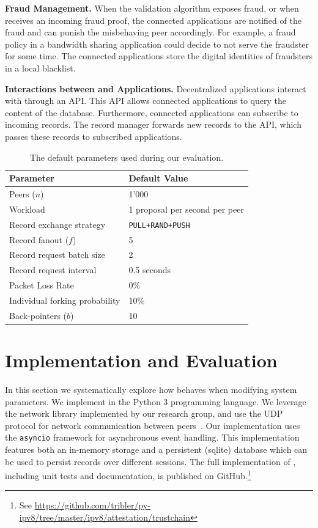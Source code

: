 \textbf{Fraud Management.}
When the validation algorithm exposes fraud, or when \TrustChain{} receives an incoming fraud proof, the connected applications are notified of the fraud and can punish the misbehaving peer accordingly.
For example, a fraud policy in a bandwidth sharing application could decide to not serve the fraudster for some time.
The connected applications store the digital identities of fraudsters in a local blacklist.

\textbf{Interactions between \TrustChain{} and Applications.}
Decentralized applications interact with \TrustChain{} through an API.
This API allows connected applications to query the content of the database.
Furthermore, connected applications can subscribe to incoming records.
The record manager forwards new records to the API, which passes these records to subscribed applications.

\begin{table}[]
	\begin{center}
		\begin{tabular}{l l}
			\hline
			\textbf{Parameter} & \textbf{Default Value}  \\ \hline
			Peers ($ n $) & 1'000 \\
			Workload & 1 proposal per second per peer \\
			Record exchange strategy & \texttt{PULL+RAND+PUSH} \\
			Record fanout ($ f $) & 5 \\
			Record request batch size & 2 \\
			Record request interval & 0.5 seconds \\
			Packet Loss Rate & 0\% \\
			Individual forking probability & 10\% \\
			Back-pointers ($ b $) & 10 \\ \hline
		\end{tabular}
		\caption{The default parameters used during our evaluation.}
		\label{tab:experiment_parameters}
	\end{center}
\end{table}


\section{Implementation and Evaluation}
\label{sec:implementation_evaluation}
In this section we systematically explore how \TrustChain{} behaves when modifying system parameters.
We implement \TrustChain{} in the Python 3 programming language.
We leverage the network library implemented by our research group, and use the UDP protocol for network communication between peers~\cite{ipv8}.
Our implementation uses the \texttt{asyncio} framework for asynchronous event handling.
This implementation features both an in-memory storage and a persistent (sqlite) database which can be used to persist records over different sessions.
The full implementation of \TrustChain{}, including unit tests and documentation, is published on GitHub.\footnote{See \url{https://github.com/tribler/py-ipv8/tree/master/ipv8/attestation/trustchain}}

